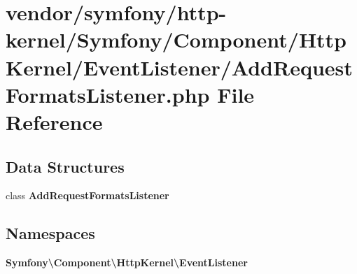 \section{vendor/symfony/http-\/kernel/\+Symfony/\+Component/\+Http\+Kernel/\+Event\+Listener/\+Add\+Request\+Formats\+Listener.php File Reference}
\label{_add_request_formats_listener_8php}
\subsection*{Data Structures}
\begin{DoxyCompactItemize}
\item 
class {\bf Add\+Request\+Formats\+Listener}
\end{DoxyCompactItemize}
\subsection*{Namespaces}
\begin{DoxyCompactItemize}
\item 
 {\bf Symfony\textbackslash{}\+Component\textbackslash{}\+Http\+Kernel\textbackslash{}\+Event\+Listener}
\end{DoxyCompactItemize}
